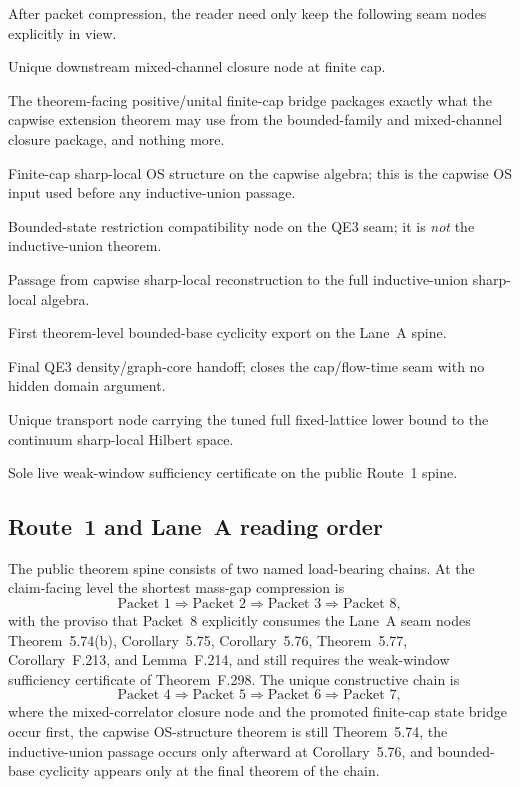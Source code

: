 After packet compression, the reader need only keep the following seam nodes explicitly in view.
\begin{description}[leftmargin=2.2em,style=nextline]
\item[Theorem~F.331(i).] Unique downstream mixed-channel closure node at finite cap.
\item[Promoted bridge into Theorem~5.74.] The theorem-facing positive/unital finite-cap bridge packages exactly what the capwise extension theorem may use from the bounded-family and mixed-channel closure package, and nothing more.
\item[Theorem~5.74(b).] Finite-cap sharp-local OS structure on the capwise algebra; this is the capwise OS input used before any inductive-union passage.
\item[Corollary~5.75.] Bounded-state restriction compatibility node on the QE3 seam; it is \emph{not} the inductive-union theorem.
\item[Corollary~5.76.] Passage from capwise sharp-local reconstruction to the full inductive-union sharp-local algebra.
\item[Theorem~5.77.] First theorem-level bounded-base cyclicity export on the Lane~A spine.
\item[Lemma~F.214.] Final QE3 density/graph-core handoff; closes the cap/flow-time seam with no hidden domain argument.
\item[Theorem~F.216.] Unique transport node carrying the tuned full fixed-lattice lower bound to the continuum sharp-local Hilbert space.
\item[Theorem~F.298.] Sole live weak-window sufficiency certificate on the public Route~1 spine.
\end{description}

\subsection{Route~1 and Lane~A reading order}

The public theorem spine consists of two named load-bearing chains. At the claim-facing level the shortest mass-gap compression is
\[
  \text{Packet 1}\Rightarrow \text{Packet 2}\Rightarrow \text{Packet 3}\Rightarrow \text{Packet 8},
\]
with the proviso that Packet~8 explicitly consumes the Lane~A seam nodes Theorem~5.74(b), Corollary~5.75, Corollary~5.76, Theorem~5.77, Corollary~F.213, and Lemma~F.214, and still requires the weak-window sufficiency certificate of Theorem~F.298. The unique constructive chain is
\[
  \text{Packet 4}\Rightarrow \text{Packet 5}\Rightarrow \text{Packet 6}\Rightarrow \text{Packet 7},
\]
where the mixed-correlator closure node and the promoted finite-cap state bridge occur first, the capwise OS-structure theorem is still Theorem~5.74, the inductive-union passage occurs only afterward at Corollary~5.76, and bounded-base cyclicity appears only at the final theorem of the chain.

